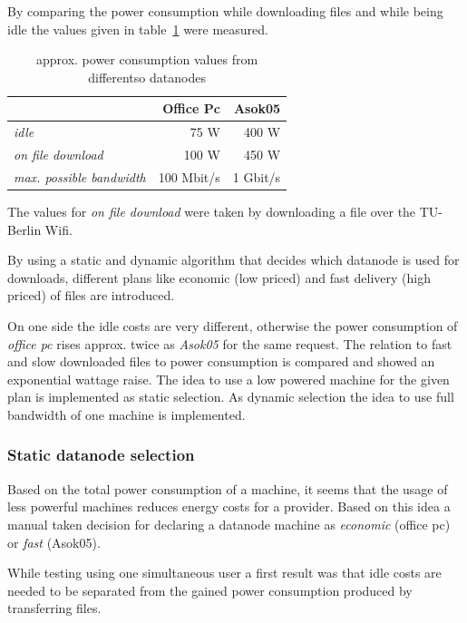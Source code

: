 By comparing the power consumption while downloading files and while being idle the values given in table~\ref{tab:powerconsumptionvalues} were measured.

\begin{table}
	\centering
	\caption{approx. power consumption values from differentso datanodes}	
	\begin{tabular}{|l|r|r|}
		\hline \rule[-2ex]{0pt}{5.5ex}  & \textbf{Office Pc} & \textbf{Asok05} \\ 
		\hline \rule[-2ex]{0pt}{5.5ex} \textit{idle} &   75 W &   400 W \\ 
		\hline \rule[-2ex]{0pt}{5.5ex} \textit{on file download} & 100 W &  450 W \\ 
		\hline \rule[-2ex]{0pt}{5.5ex} \textit{max. possible bandwidth} & 100 Mbit/s & 1 Gbit/s \\
		\hline
	\end{tabular} 
	\label{tab:powerconsumptionvalues}
\end{table}

The values for \textit{on file download} were taken by downloading a file over the TU-Berlin Wifi.

By using a static and dynamic algorithm that decides which datanode is used for downloads, different plans like economic (low priced) and fast delivery (high priced) of files are introduced.

On one side the idle costs are very different, otherwise the power consumption of \textit{office pc} rises approx. twice as \textit{Asok05} for the same request. The relation to fast and slow downloaded files to power consumption is compared and showed an exponential wattage raise. The idea to use a low powered machine for the given plan is implemented as static selection. As dynamic selection the idea to use full bandwidth of one machine is implemented.

\subsubsection{Static datanode selection}

Based on the total power consumption of a machine, it seems that the usage of less powerful machines reduces energy costs for a provider. Based on this idea a manual taken decision for declaring a datanode machine as \textit{economic} (office pc) or \textit{fast} (Asok05). 

While testing using one simultaneous user a first result was that idle costs are needed to be separated from the gained power consumption produced by transferring files. 

